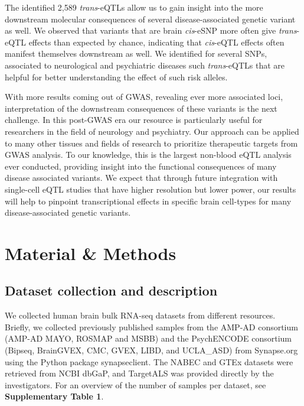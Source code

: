 The identified 2,589 \emph{trans}-eQTLs allow us to gain insight into the more downstream molecular consequences of several disease-associated genetic variant as well. We observed that variants that are brain \emph{cis}-eSNP more often give \emph{trans}-eQTL effects than expected by chance, indicating that \emph{cis}-eQTL effects often manifest themselves downstream as well. We identified for several SNPs, associated to neurological and psychiatric diseases such \emph{trans}-eQTLs that are helpful for better understanding the effect of such risk alleles. 

With more results coming out of GWAS, revealing ever more associated loci, interpretation of the downstream consequences of these variants is the next challenge. In this post-GWAS era our resource is particularly useful for researchers in the field of neurology and psychiatry. Our approach can be applied to many other tissues and fields of research to prioritize therapeutic targets from GWAS analysis. To our knowledge, this is the largest non-blood eQTL analysis ever conducted, providing insight into the functional consequences of many disease associated variants. We expect that through future integration with single-cell eQTL studies that have higher resolution but lower power, our results will help to pinpoint transcriptional effects in specific brain cell-types for many disease-associated genetic variants. 

\section{Material \& Methods}
\subsection{Dataset collection and description }
We collected human brain bulk RNA-seq datasets from different resources. Briefly, we collected previously published samples from the AMP-AD consortium (AMP-AD MAYO\cite{hodesAcceleratingMedicinesPartnership2016}, ROSMAP\cite{hodesAcceleratingMedicinesPartnership2016} and MSBB\cite{hodesAcceleratingMedicinesPartnership2016}) and the PsychENCODE consortium (Bipseq\cite{wangComprehensiveFunctionalGenomic2018}, BrainGVEX\cite{wangComprehensiveFunctionalGenomic2018}, CMC\cite{fromerGeneExpressionElucidates2016}, GVEX, LIBD, and UCLA\_ASD\cite{wangComprehensiveFunctionalGenomic2018}) from Synapse.org using the Python package synapseclient\cite{teamSynapseclientClientSynapse}. The NABEC and GTEx datasets were retrieved from NCBI dbGaP, and TargetALS was provided directly by the investigators. For an overview of the number of samples per dataset, see \textbf{Supplementary Table 1}. 

